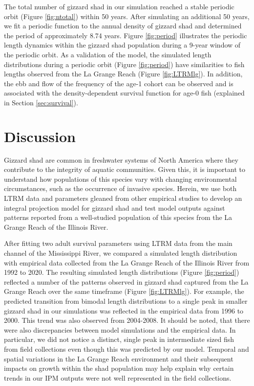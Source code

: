 \documentclass[preprint,review,12pt,authoryear]{elsarticle}
\providecommand{\DIFaddend}{} %
\begin{document}
\DIFaddend The total number of gizzard shad in our simulation reached a stable periodic orbit (Figure \ref{fig:ntotal}) within 50 years. 
After simulating an additional 50 years, we fit a periodic function to the annual density of gizzard shad and determined the period of approximately 8.74 years. 
Figure \ref{fig:period} illustrates the periodic length dynamics within the gizzard shad population during a 9-year window of the periodic orbit.  
As a validation of the model, the simulated length distributions during a periodic orbit (Figure \ref{fig:period}) have similarities to fish lengths observed from the La Grange Reach (Figure \ref{fig:LTRMlg}). 
In addition, the ebb and flow of the frequency of the age-1 cohort can be observed and is associated with the density-dependent survival function for age-0 fish (explained in Section \ref{sec:survival}).

\section{Discussion}
Gizzard shad are common in freshwater systems of North America where they contribute to the integrity of aquatic communities. 
Given this, it is important to understand how populations of this species vary with changing environmental circumstances, such as the occurrence of invasive species. 
Herein, we use both LTRM data and parameters gleaned from other empirical studies to develop an integral projection model for gizzard shad and test model outputs against patterns reported from a well-studied population of this species from the La Grange Reach of the Illinois River.   

After fitting two adult survival parameters using LTRM data from the main channel of the Mississippi River, we compared a simulated length distribution with empirical data collected from the La Grange Reach of the Illinois River from 1992 to 2020. 
The resulting simulated length distributions (Figure \ref{fig:period}) reflected a number of the patterns observed in gizzard shad captured from the La Grange Reach over the same timeframe (Figure \ref{fig:LTRMlg}). 
For example, the predicted transition from bimodal length distributions to a single peak in smaller gizzard shad in our simulations was reflected in the empirical data from 1996 to 2000. 
This trend was also observed from 2004-2008.  
It should be noted, that there were also discrepancies between model simulations and the empirical data. 
In particular, we did not notice a distinct, single peak in intermediate sized fish from field collections even though this was predicted by our model. 
Temporal and spatial variations in the La Grange Reach environment and their subsequent impacts on growth within the shad population may help explain why certain trends in our IPM outputs were not well represented in the field collections.   
\end{document}
